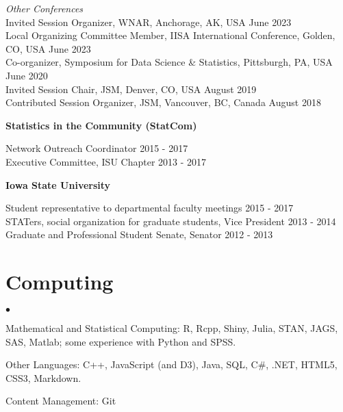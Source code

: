 \documentclass[margin,line]{res}
\newenvironment{list2}{
  \begin{list}{$\bullet$}{%
      \setlength{\itemsep}{0in}
      \setlength{\parsep}{0in} \setlength{\parskip}{0in}
      \setlength{\topsep}{0in} \setlength{\partopsep}{0in}
      \setlength{\leftmargin}{0.2in}}}{\end{list}}
\begin{document}
\begin{resume}
\vspace{-.3cm}
{\em Other Conferences} \\
Invited Session Organizer, WNAR, Anchorage, AK, USA \hfill {June 2023} \\
Local Organizing Committee Member,  IISA International Conference, Golden, CO, USA \hfill {June 2023} \\
Co-organizer, Symposium for Data Science \& Statistics, Pittsburgh, PA, USA \hfill {June 2020} \\
Invited Session Chair, JSM, Denver, CO, USA \hfill {August 2019} \\
Contributed Session Organizer, JSM, Vancouver, BC, Canada \hfill {August 2018}

{\bf Statistics in the Community (StatCom)}

\vspace{-.3cm}
Network Outreach Coordinator \hfill {2015 - 2017}\\
Executive Committee, ISU Chapter \hfill {2013 - 2017}

{\bf Iowa State University}

\vspace{-.3cm}
Student representative to departmental faculty meetings \hfill {2015 - 2017}\\
STATers, social organization for graduate students, Vice President \hfill {2013 - 2014}\\
Graduate and Professional Student Senate, Senator \hfill {2012 - 2013}



\section{\sc Computing}
\begin{list2}
\item Mathematical and Statistical Computing:  R, Rcpp, Shiny, Julia, STAN, JAGS, SAS, Matlab; some experience  with Python and SPSS.
\item Other Languages: C++, JavaScript (and D3), Java, SQL, C\#, .NET, HTML5, CSS3, Markdown.
\item Content Management: Git
\end{list2}


\end{resume}
\end{document}
